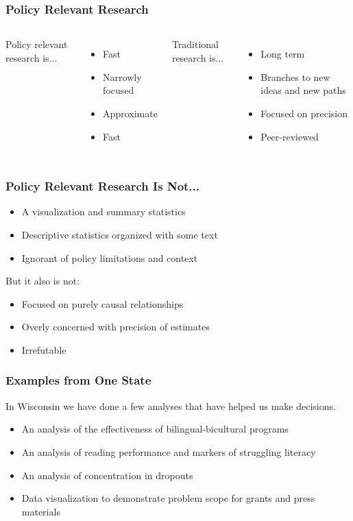 \documentclass{beamer}
\begin{document}
\begin{frame}
\frametitle{Policy Relevant Research}
  \begin{columns}
  Policy relevant research is...
  \begin{itemize}
  \item Fast
  \pause
  \item Narrowly focused
  \pause
  \item Approximate
  \pause
  \item Fast
  \end{itemize}
  Traditional research is...
  \begin{itemize}
  \item Long term
  \pause
  \item Branches to new ideas and new paths
  \pause
  \item Focused on precision 
  \pause
  \item Peer-reviewed
  \end{itemize}
  \end{columns}
\end{frame}

\begin{frame}
\frametitle{Policy Relevant Research Is Not...}
  \begin{itemize}
  \item A visualization and summary statistics
  \item Descriptive statistics organized with some text
  \item Ignorant of policy limitations and context
  \end{itemize}
\begin{center}
But it also is not:
\end{center}
  \begin{itemize}
    \item Focused on purely causal relationships
    \item Overly concerned with precision of estimates
    \item Irrefutable 
  \end{itemize}
\end{frame}

\begin{frame}
\frametitle{Examples from One State}
  In Wisconsin we have done a few analyses that have helped us make decisions. 
  \begin{itemize}
  \item An analysis of the effectiveness of bilingual-bicultural programs
  \pause
  \item An analysis of reading performance and markers of struggling literacy
  \pause
  \item An analysis of concentration in dropouts
  \pause
  \item Data visualization to demonstrate problem scope for grants and press materials
  \end{itemize}
\end{frame}
\end{document}
